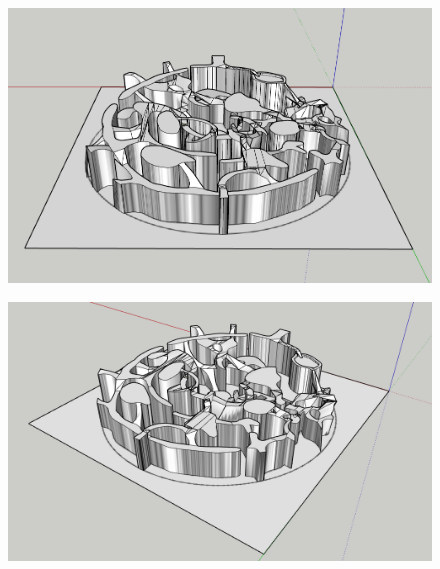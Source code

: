 \begin{figure}[H]
	\centering
	\includegraphics[width=14cm]{images/map/3D_map_007.png}
\end{figure}
\vspace*{3cm}
\begin{figure}[H]
	\centering
	\includegraphics[width=14cm]{images/map/3D_map_008.png}
\end{figure}

